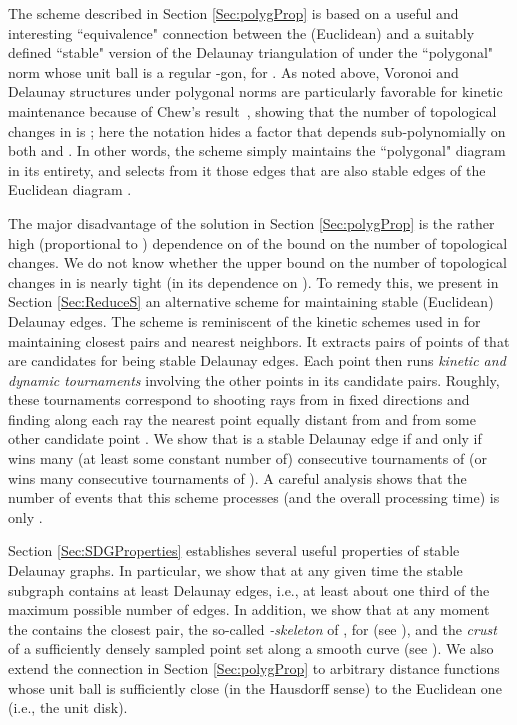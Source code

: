 \documentclass[letter,11pt]{article}
\begin{document}
The scheme described in Section \ref{Sec:polygProp} is based on a useful and interesting ``equivalence" connection
between the (Euclidean)  and a suitably defined ``stable" version of the Delaunay triangulation of  under the ``polygonal" norm whose unit ball  is a regular
-gon, for . As noted above, Voronoi and Delaunay structures under polygonal norms are particularly
favorable for kinetic maintenance because of Chew's
result~\cite{Chew}, showing that the number of topological changes in
 is ; here
the  notation hides a factor that depends
sub-polynomially on both  and . In other words, the scheme simply maintains the ``polygonal" diagram  in its entirety, and selects from it those edges that are also stable edges of the Euclidean diagram .

The major disadvantage of the solution in Section \ref{Sec:polygProp} is
the rather high (proportional to ) dependence on 
 of the bound on the number of
topological changes. We do not know whether the upper bound  on the number of topological changes in
 is nearly tight (in its dependence on ). 
To remedy this, we present in Section \ref{Sec:ReduceS} an 
alternative scheme for maintaining stable
(Euclidean) Delaunay edges. The scheme is reminiscent of the kinetic
schemes used in \cite{KineticNeighbors} for maintaining closest pairs
and nearest neighbors. It extracts  pairs of points of  
that are candidates for being stable Delaunay edges. Each point
 then runs  \textit{kinetic and dynamic tournaments} involving
the other points in its candidate pairs. Roughly, these tournaments
correspond to shooting  rays from  in fixed directions and finding along each ray
the nearest point equally distant from  and from some other
candidate point . We show that  is a stable Delaunay edge if and
only if  wins many (at least some constant number of) consecutive tournaments of  (or  wins many consecutive tournaments of ). A careful analysis shows that
the number of events that this scheme processes (and the overall 
processing time) is only .

Section \ref{Sec:SDGProperties} establishes several useful properties of stable Delaunay graphs. In particular, we show that at
any given time the stable subgraph contains at least  Delaunay
edges, i.e., at least about one third of the maximum possible number of edges. In addition, we 
show that at any moment the  contains the closest pair, the so-called 
\textit{-skeleton} of , for  (see \cite{Crusts,Skeletons}), and the \textit{crust} of a sufficiently densely sampled point set along a smooth curve (see \cite{Amenta,Crusts}). 
We also extend the connection in Section \ref{Sec:polygProp} to arbitrary distance functions  whose unit ball  is sufficiently close (in the Hausdorff sense) to the Euclidean one (i.e., the unit disk).
\end{document}
